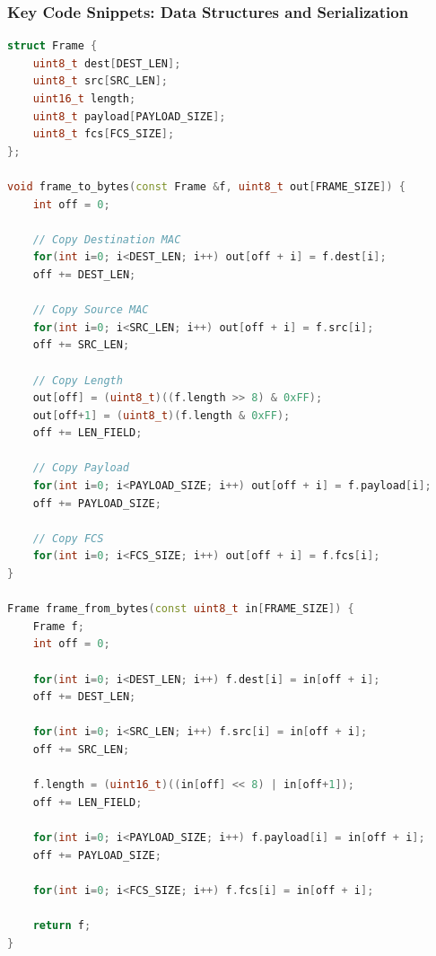 \documentclass[12pt, a4paper]{article}
\begin{document}
\subsubsection{Key Code Snippets: Data Structures and Serialization}
\begin{lstlisting}[language=C++]
struct Frame {
    uint8_t dest[DEST_LEN];
    uint8_t src[SRC_LEN];
    uint16_t length;
    uint8_t payload[PAYLOAD_SIZE];
    uint8_t fcs[FCS_SIZE];
};

void frame_to_bytes(const Frame &f, uint8_t out[FRAME_SIZE]) {
    int off = 0;
    
    // Copy Destination MAC
    for(int i=0; i<DEST_LEN; i++) out[off + i] = f.dest[i];
    off += DEST_LEN;
    
    // Copy Source MAC
    for(int i=0; i<SRC_LEN; i++) out[off + i] = f.src[i];
    off += SRC_LEN;
    
    // Copy Length
    out[off] = (uint8_t)((f.length >> 8) & 0xFF);
    out[off+1] = (uint8_t)(f.length & 0xFF); 
    off += LEN_FIELD;
    
    // Copy Payload
    for(int i=0; i<PAYLOAD_SIZE; i++) out[off + i] = f.payload[i];
    off += PAYLOAD_SIZE;
    
    // Copy FCS
    for(int i=0; i<FCS_SIZE; i++) out[off + i] = f.fcs[i];
}

Frame frame_from_bytes(const uint8_t in[FRAME_SIZE]) {
    Frame f;
    int off = 0;
    
    for(int i=0; i<DEST_LEN; i++) f.dest[i] = in[off + i];
    off += DEST_LEN;
    
    for(int i=0; i<SRC_LEN; i++) f.src[i] = in[off + i];
    off += SRC_LEN;
    
    f.length = (uint16_t)((in[off] << 8) | in[off+1]); 
    off += LEN_FIELD;
    
    for(int i=0; i<PAYLOAD_SIZE; i++) f.payload[i] = in[off + i];
    off += PAYLOAD_SIZE;
    
    for(int i=0; i<FCS_SIZE; i++) f.fcs[i] = in[off + i];
    
    return f;
}
\end{lstlisting}
\end{document}
